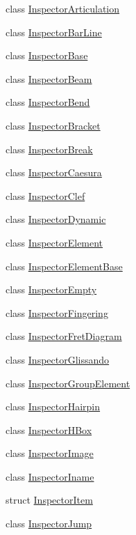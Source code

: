 \begin{DoxyCompactItemize}
class \hyperlink{class_ms_1_1_inspector_articulation}{Inspector\+Articulation}
\item 
class \hyperlink{class_ms_1_1_inspector_bar_line}{Inspector\+Bar\+Line}
\item 
class \hyperlink{class_ms_1_1_inspector_base}{Inspector\+Base}
\item 
class \hyperlink{class_ms_1_1_inspector_beam}{Inspector\+Beam}
\item 
class \hyperlink{class_ms_1_1_inspector_bend}{Inspector\+Bend}
\item 
class \hyperlink{class_ms_1_1_inspector_bracket}{Inspector\+Bracket}
\item 
class \hyperlink{class_ms_1_1_inspector_break}{Inspector\+Break}
\item 
class \hyperlink{class_ms_1_1_inspector_caesura}{Inspector\+Caesura}
\item 
class \hyperlink{class_ms_1_1_inspector_clef}{Inspector\+Clef}
\item 
class \hyperlink{class_ms_1_1_inspector_dynamic}{Inspector\+Dynamic}
\item 
class \hyperlink{class_ms_1_1_inspector_element}{Inspector\+Element}
\item 
class \hyperlink{class_ms_1_1_inspector_element_base}{Inspector\+Element\+Base}
\item 
class \hyperlink{class_ms_1_1_inspector_empty}{Inspector\+Empty}
\item 
class \hyperlink{class_ms_1_1_inspector_fingering}{Inspector\+Fingering}
\item 
class \hyperlink{class_ms_1_1_inspector_fret_diagram}{Inspector\+Fret\+Diagram}
\item 
class \hyperlink{class_ms_1_1_inspector_glissando}{Inspector\+Glissando}
\item 
class \hyperlink{class_ms_1_1_inspector_group_element}{Inspector\+Group\+Element}
\item 
class \hyperlink{class_ms_1_1_inspector_hairpin}{Inspector\+Hairpin}
\item 
class \hyperlink{class_ms_1_1_inspector_h_box}{Inspector\+H\+Box}
\item 
class \hyperlink{class_ms_1_1_inspector_image}{Inspector\+Image}
\item 
class \hyperlink{class_ms_1_1_inspector_iname}{Inspector\+Iname}
\item 
struct \hyperlink{struct_ms_1_1_inspector_item}{Inspector\+Item}
\item 
class \hyperlink{class_ms_1_1_inspector_jump}{Inspector\+Jump}

\end{DoxyCompactItemize}
